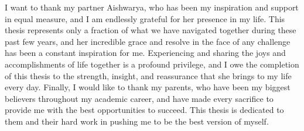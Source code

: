 \begin{acknowledgements}
I want to thank my partner Aishwarya, who has been my inspiration and support in equal measure, and I am endlessly grateful for her presence in my life. This thesis represents only a fraction of what we have navigated together during these past few years, and her incredible grace and resolve in the face of any challenge has been a constant inspiration for me. Experiencing and sharing the joys and accomplishments of life together is a profound privilege, and I owe the completion of this thesis to the strength, insight, and reassurance that she brings to my life every day. Finally, I would like to thank my parents, who have been my biggest believers throughout my academic career, and have made every sacrifice to provide me with the best opportunities to succeed. This thesis is dedicated to them and their hard work in pushing me to be the best version of myself.

\end{acknowledgements}
